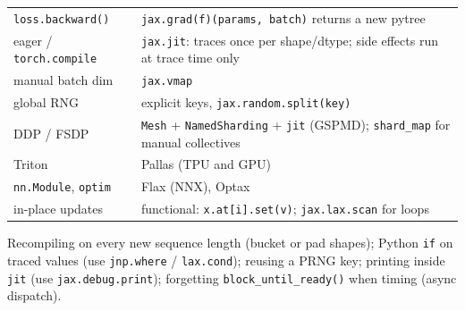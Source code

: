 \begin{mem}
\begin{tabularx}{\linewidth}{@{}lL@{}}
\toprule
\texttt{loss.backward()} & \texttt{jax.grad(f)(params, batch)} returns a new pytree\\
eager / \texttt{torch.compile} & \texttt{jax.jit}: traces once per shape/dtype; side effects run at trace time only\\
manual batch dim & \texttt{jax.vmap}\\
global RNG & explicit keys, \texttt{jax.random.split(key)}\\
DDP / FSDP & \texttt{Mesh} + \texttt{NamedSharding} + \texttt{jit} (GSPMD); \texttt{shard\_map} for manual collectives\\
Triton & Pallas (TPU and GPU)\\
\texttt{nn.Module}, \texttt{optim} & Flax (NNX), Optax\\
in-place updates & functional: \texttt{x.at[i].set(v)}; \texttt{jax.lax.scan} for loops\\\bottomrule
\end{tabularx}
\end{mem}

\begin{trap}
Recompiling on every new sequence length (bucket or pad shapes); Python \texttt{if} on traced values (use \texttt{jnp.where} / \texttt{lax.cond}); reusing a PRNG key; printing inside \texttt{jit} (use \texttt{jax.debug.print}); forgetting \texttt{block\_until\_ready()} when timing (async dispatch).
\end{trap}
